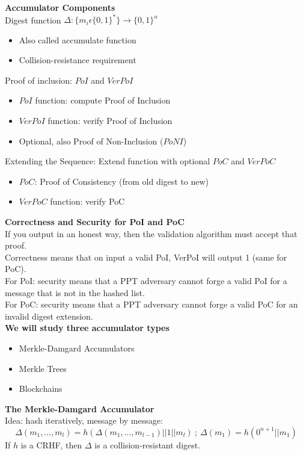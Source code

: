 \documentclass{article}
\begin{document}
\textbf{Accumulator Components}\\
Digest function $\Delta : \{m_i\epsilon \{0,1\}^*\}\rightarrow\{0,1\}^n$\begin{itemize}
	\item Also called accumulate function
	\item Collision-resistance requirement
\end{itemize}
Proof of inclusion: $PoI$ and $VerPoI$\begin{itemize}
	\item $PoI$ function: compute Proof of Inclusion
	\item $VerPoI$ function: verify Proof of Inclusion
	\item Optional, also Proof of Non-Inclusion ($PoNI$)
\end{itemize}
Extending the Sequence: Extend function with optional $PoC$ and $VerPoC$\begin{itemize}
	\item $PoC$: Proof of Consistency (from old digest to new)
	\item $VerPoC$ function: verify PoC
\end{itemize}

\textbf{Correctness and Security for PoI and PoC}\\
If you output in an honest way, then the validation algorithm must accept that proof.\\
Correctness means that on input a valid PoI, VerPoI will output 1 (same for PoC).\\
For PoI: security means that a PPT adversary cannot forge a valid PoI for a message that is not in the hashed list.\\
For PoC: security means that a PPT adversary cannot forge a valid PoC for an invalid digest extension.\\

\textbf{We will study three accumulator types}\begin{itemize}
	\item Merkle-Damgard Accumulators
	\item Merkle Trees
	\item Blockchains
\end{itemize}

\textbf{The Merkle-Damgard Accumulator}\\
Idea: hash iteratively, message by message:
\[\Delta(m_1,...,m_l)=h(\Delta(m_1,...,m_{l-1})||1||m_l)\ ;\ \Delta(m_1)=h(0^{n+1}||m_1)\]
If $h$ is a CRHF, then $\Delta$ is a collision-resistant digest.\\
\end{document}
